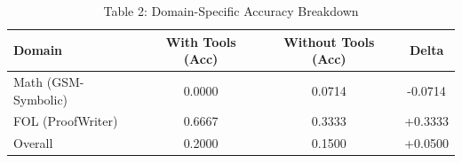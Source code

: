 \begin{table}[htbp]
  \centering
  \caption{Table 2: Domain-Specific Accuracy Breakdown}
  \begin{tabular}{lccc}
    \toprule
    \textbf{Domain} & \textbf{With Tools (Acc)} & \textbf{Without Tools (Acc)} & \textbf{Delta} \\
    \midrule
    Math (GSM-Symbolic) & 0.0000 & 0.0714 & -0.0714 \\
    FOL (ProofWriter) & 0.6667 & 0.3333 & +0.3333 \\
    Overall & 0.2000 & 0.1500 & +0.0500 \\
    \bottomrule
  \end{tabular}
\end{table}